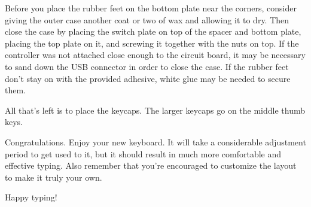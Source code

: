 \documentclass{article}
\begin{document}
\vspace{1em}

Before you place the rubber feet on the bottom plate near the corners,
consider giving the outer case another coat or two of wax and allowing
it to dry. Then close the case by placing the switch plate on top of
the spacer and bottom plate, placing the top plate on it, and screwing
it together with the nuts on top. If the controller was not attached
close enough to the circuit board, it may be necessary to sand down
the USB connector in order to close the case. If the rubber feet don't
stay on with the provided adhesive, white glue may be needed to secure
them.

\vspace{1em}

All that's left is to place the keycaps. The larger keycaps go on the
middle thumb keys.

\vspace{1em}

Congratulations. Enjoy your new keyboard. It will take a considerable
adjustment period to get used to it, but it should result in much more
comfortable and effective typing. Also remember that you're encouraged
to customize the layout to make it truly your own.

\vspace{1em}

Happy typing!

\end{document}
